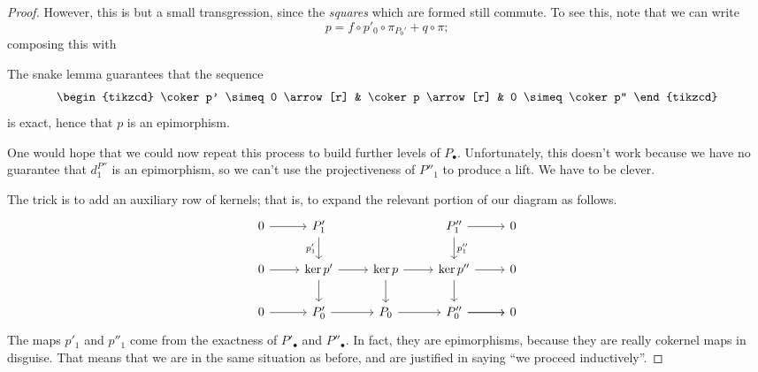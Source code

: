 \documentclass[main.tex]{subfiles}
\begin{document}
\begin{proof}
  However, this is but a small transgression, since the \emph{squares} which are formed still commute. To see this, note that we can write
  \begin{equation*}
    p = f \circ p'_{0} \circ \pi_{P_{0}'} + q \circ \pi;
  \end{equation*}
  composing this with

  The snake lemma guarantees that the sequence
  \begin{equation*}
    \begin{tikzcd}
      \coker p' \simeq 0
      \arrow[r]
      & \coker p
      \arrow[r]
      & 0 \simeq \coker p''
    \end{tikzcd}
  \end{equation*}
  is exact, hence that $p$ is an epimorphism.

  One would hope that we could now repeat this process to build further levels of $P_{\bullet}$. Unfortunately, this doesn't work because we have no guarantee that $d^{P''}_{1}$ is an epimorphism, so we can't use the projectiveness of $P''_{1}$ to produce a lift. We have to be clever.

  The trick is to add an auxiliary row of kernels; that is, to expand the relevant portion of our diagram as follows.
  \begin{equation*}
    \begin{tikzcd}
      0
      \arrow[r]
      & P'_{1}
      \arrow[d, swap, "p_{1}'"]
      && P''_{1}
      \arrow[r]
      \arrow[d, "p_{1}''"]
      & 0
      \\
      0
      \arrow[r]
      & \ker p'
      \arrow[r]
      \arrow[d]
      & \ker p
      \arrow[r]
      \arrow[d]
      & \ker p''
      \arrow[r]
      \arrow[d]
      & 0
      \\
      0
      \arrow[r]
      & P'_{0}
      \arrow[r]
      & P_{0}
      \arrow[r]
      & P''_{0}
      \arrow[r]
      \arrow[r]
      & 0
    \end{tikzcd}
  \end{equation*}
  The maps $p'_{1}$ and $p''_{1}$ come from the exactness of $P'_{\bullet}$ and $P''_{\bullet}$. In fact, they are epimorphisms, because they are really cokernel maps in disguise. That means that we are in the same situation as before, and are justified in saying ``we proceed inductively''.
\end{proof}
\end{document}
